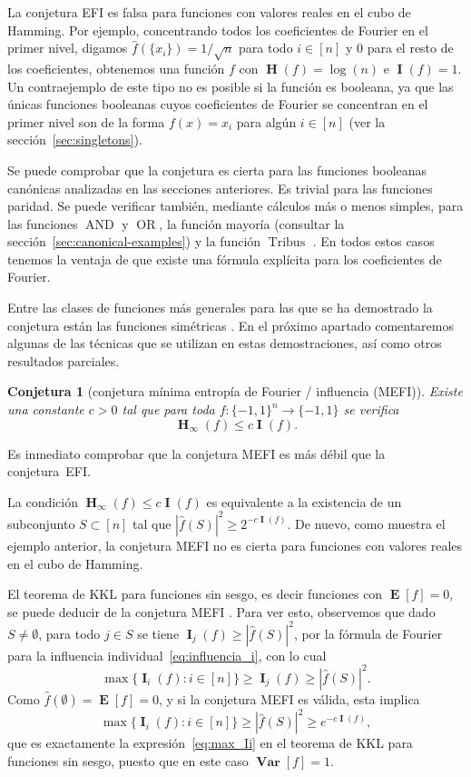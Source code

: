 \documentclass[autocontact]{gaceta}
\newtheorem{conjecture}{Conjetura}
\DeclareMathOperator{\Var}{\mathbf{Var}}
\DeclareMathOperator{\II}{\mathbf{I}}
\DeclareMathOperator{\EE}{\mathbf{E}}
\DeclareMathOperator{\HH}{\mathbf{H}}
\DeclareMathOperator{\AND}{AND}
\DeclareMathOperator{\OR}{OR}
\DeclareMathOperator{\Tribus}{Tribus}
\begin{document}
La conjetura EFI es falsa para funciones con valores reales en el cubo de Hamming. Por ejemplo, concentrando todos los coeficientes de Fourier en el primer nivel, digamos $\widehat{f}(\{x_i\})=1/\sqrt{n}$ para todo $i\in [n]$ y $0$ para el resto de los coeficientes, obtenemos una función $f$ con $\HH(f)=\log(n)$ e $\II(f)=1$. Un contraejemplo de este tipo no es posible si la función es booleana, ya que las únicas funciones booleanas cuyos coeficientes de Fourier se concentran en el primer nivel son de la forma $f(x)=x_i$ para algún $i\in [n]$ (ver la sección~\ref{sec:singletons}).

Se puede comprobar que la conjetura es cierta para las funciones booleanas canónicas analizadas en las secciones anteriores. Es trivial para las funciones paridad. Se puede verificar también, mediante cálculos más o menos simples, para las funciones $\AND$ y $\OR$, la función mayoría (consultar la sección~\ref{sec:canonical-examples}) y la función $\Tribus$ \cite{BL85}. En todos estos casos tenemos la ventaja de que existe una fórmula explícita para los coeficientes de Fourier.

Entre las clases de funciones más generales para las que se ha demostrado la conjetura están las funciones simétricas
\cite{OWZ11}. En el próximo apartado comentaremos algunas de las técnicas que se utilizan en estas demostraciones, así como otros resultados parciales.

\begin{conjecture}[conjetura mínima entropía de Fourier / influencia (MEFI)]
Existe una constante $c>0$ tal que para toda $f:\{-1,1\}^n\to\{-1,1\}$ se verifica
\[
\HH_{\infty}(f)\leq c \II(f).
\]
\end{conjecture}

Es inmediato comprobar que la conjetura MEFI es más débil que la conjetura~EFI.

La condición $\HH_{\infty}(f)\leq c \II(f)$ es equivalente a la existencia de un subconjunto $S\subset [n]$ tal que $|\widehat{f}(S)|^2\geq 2^{-c \II(f)}$. De nuevo, como muestra el ejemplo anterior, la conjetura MEFI no es cierta para funciones con valores reales en el cubo de Hamming.

El teorema de KKL para funciones sin sesgo, es decir funciones con $\EE[f]=0$, se puede deducir de la conjetura MEFI \cite{ACK+20, OWZ11}. Para ver esto, observemos que dado $S\neq \emptyset$, para todo $j \in S$ se tiene $\II_j(f)\geq |\widehat{f}(S)|^2$, por la fórmula de Fourier para la influencia individual~\eqref{eq:influencia_i}, con lo cual
\[
\max\{ \II_i (f): i\in [n]\} \geq \II_j(f)\geq |\widehat{f}(S)|^2.
\]
Como $\widehat{f}(\emptyset)=\EE[f]=0$, y si la conjetura MEFI es válida, esta implica
\[
\max \{ \II_i (f): i\in [n]\} \geq | \widehat{f}(S)|^2\geq e^{-c \II(f)},
\]
que es exactamente la expresión~\eqref{eq:max_Ii} en el teorema de KKL para funciones sin sesgo, puesto que en este caso $\Var[f]=1$.
\end{document}
